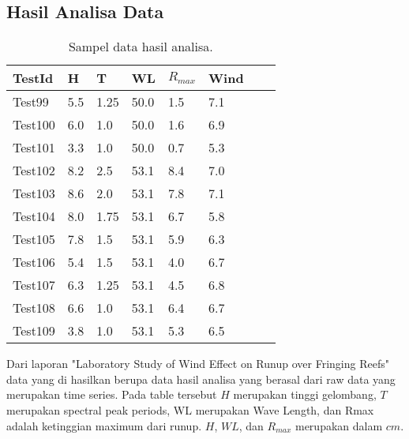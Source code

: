 \subsection{Hasil Analisa Data}
    \begin{table}
    \caption{Sampel data hasil analisa.}
    \begin{center}
      \begin{tabular}{|l|l|l|l|l|l|l|l|}
      \hline
      TestId & H & T & WL & $R_{max}$ & Wind \\ \hline
      Test99 & 5.5 & 1.25 & 50.0 & 1.5 & 7.1 \\ \hline
      Test100 & 6.0 & 1.0 & 50.0 & 1.6 & 6.9 \\ \hline
      Test101 & 3.3 & 1.0 & 50.0 & 0.7 & 5.3 \\ \hline
      Test102 & 8.2 & 2.5 & 53.1 & 8.4 & 7.0 \\ \hline
      Test103 & 8.6 & 2.0 & 53.1 & 7.8 & 7.1 \\ \hline
      Test104 & 8.0 & 1.75 & 53.1 & 6.7 & 5.8 \\ \hline
      Test105 & 7.8 & 1.5 & 53.1 & 5.9 & 6.3 \\ \hline
      Test106 & 5.4 & 1.5 & 53.1 & 4.0 & 6.7 \\ \hline
      Test107 & 6.3 & 1.25 & 53.1 & 4.5 & 6.8 \\ \hline
      Test108 & 6.6 & 1.0 & 53.1 & 6.4 & 6.7 \\ \hline
      Test109 & 3.8 & 1.0 & 53.1 & 5.3 & 6.5 \\ \hline
      \end{tabular}
      \end{center}
    \end{table}
  \FloatBarrier
  Dari laporan "Laboratory Study of Wind Effect on Runup over Fringing Reefs" \cite{DemirbilekReport} data yang di hasilkan berupa data hasil analisa yang berasal dari raw data yang merupakan time series. Pada table tersebut $H$ merupakan tinggi gelombang, $T$ merupakan spectral peak periods, WL merupakan Wave Length, dan Rmax adalah ketinggian maximum dari runup. $H$, $WL$, dan $R_{max}$ merupakan dalam $cm$.

